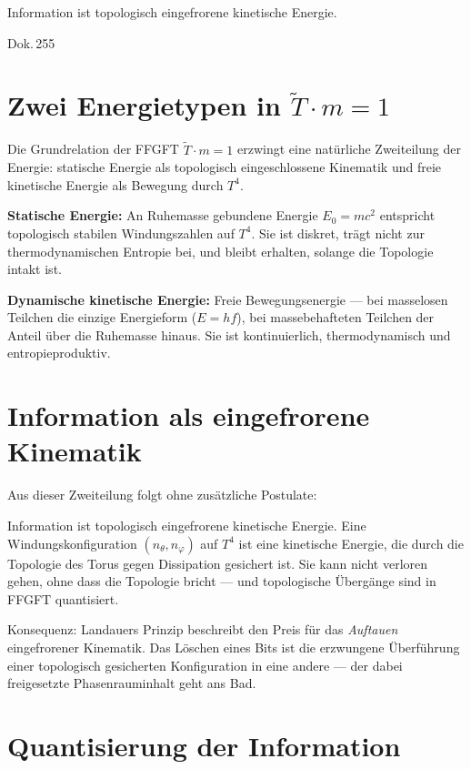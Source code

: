 \label{ch:info_als_energie}

\epigraph{Information ist topologisch eingefrorene kinetische Energie.}{Dok.\,255}

\section{Zwei Energietypen in \texorpdfstring{$\tilde{T} \cdot m = 1$}{T·m = 1}}

Die Grundrelation der FFGFT $\tilde{T} \cdot m = 1$ erzwingt eine natürliche
Zweiteilung der Energie: statische Energie als topologisch eingeschlossene
Kinematik und freie kinetische Energie als Bewegung durch $T^4$.

\textbf{Statische Energie:} An Ruhemasse gebundene Energie $E_0 = mc^2$
entspricht topologisch stabilen Windungszahlen auf $T^4$. Sie ist diskret, trägt
nicht zur thermodynamischen Entropie bei, und bleibt erhalten, solange die
Topologie intakt ist.

\textbf{Dynamische kinetische Energie:} Freie Bewegungsenergie --- bei
masselosen Teilchen die einzige Energieform ($E = hf$), bei massebehafteten
Teilchen der Anteil über die Ruhemasse hinaus. Sie ist kontinuierlich,
thermodynamisch und entropieproduktiv.

\section{Information als eingefrorene Kinematik}

Aus dieser Zweiteilung folgt ohne zusätzliche Postulate:

\begin{keyresult}
Information ist topologisch eingefrorene kinetische Energie. Eine
Windungskonfiguration $(n_\theta, n_\varphi)$ auf $T^4$ ist eine
kinetische Energie, die durch die Topologie des Torus gegen Dissipation
gesichert ist. Sie kann nicht verloren gehen, ohne dass die Topologie
bricht --- und topologische Übergänge sind in FFGFT quantisiert.
\end{keyresult}

Konsequenz: Landauers Prinzip beschreibt den Preis für das
\emph{Auftauen} eingefrorener Kinematik. Das Löschen eines Bits ist die
erzwungene Überführung einer topologisch gesicherten Konfiguration in eine
andere --- der dabei freigesetzte Phasenrauminhalt geht ans Bad.

\section{Quantisierung der Information}

